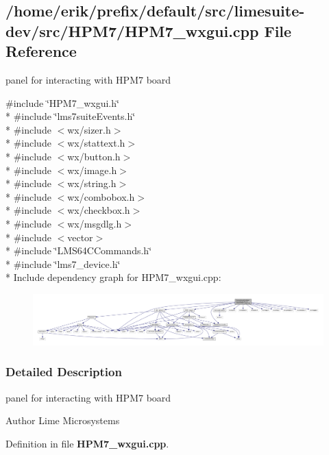 \subsection{/home/erik/prefix/default/src/limesuite-\/dev/src/\+H\+P\+M7/\+H\+P\+M7\+\_\+wxgui.cpp File Reference}
\label{HPM7__wxgui_8cpp}


panel for interacting with H\+P\+M7 board  


{\ttfamily \#include \char`\"{}H\+P\+M7\+\_\+wxgui.\+h\char`\"{}}\\*
{\ttfamily \#include \char`\"{}lms7suite\+Events.\+h\char`\"{}}\\*
{\ttfamily \#include $<$wx/sizer.\+h$>$}\\*
{\ttfamily \#include $<$wx/stattext.\+h$>$}\\*
{\ttfamily \#include $<$wx/button.\+h$>$}\\*
{\ttfamily \#include $<$wx/image.\+h$>$}\\*
{\ttfamily \#include $<$wx/string.\+h$>$}\\*
{\ttfamily \#include $<$wx/combobox.\+h$>$}\\*
{\ttfamily \#include $<$wx/checkbox.\+h$>$}\\*
{\ttfamily \#include $<$wx/msgdlg.\+h$>$}\\*
{\ttfamily \#include $<$vector$>$}\\*
{\ttfamily \#include \char`\"{}L\+M\+S64\+C\+Commands.\+h\char`\"{}}\\*
{\ttfamily \#include \char`\"{}lms7\+\_\+device.\+h\char`\"{}}\\*
Include dependency graph for H\+P\+M7\+\_\+wxgui.\+cpp\+:
\nopagebreak
\begin{figure}[H]
\begin{center}
\leavevmode
\includegraphics[width=350pt]{d6/d0d/HPM7__wxgui_8cpp__incl}
\end{center}
\end{figure}


\subsubsection{Detailed Description}
panel for interacting with H\+P\+M7 board 

\begin{DoxyAuthor}{Author}
Lime Microsystems 
\end{DoxyAuthor}


Definition in file {\bf H\+P\+M7\+\_\+wxgui.\+cpp}.

